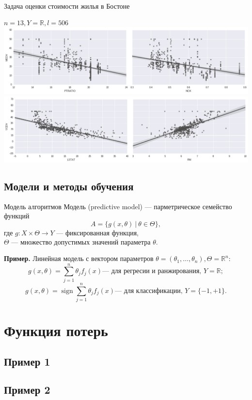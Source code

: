 \documentclass[compress]{beamer}
\DeclareMathOperator{\sign}{sign}
\begin{document}
\begin{frame}{Задача оценки стоимости жилья в Бостоне}
    \begin{center}
        $n = 13, Y= \mathbb{R}, l = 506$
        \includegraphics[width=\linewidth]{fig/boston1.png}
        \\
        \includegraphics[width=\linewidth]{fig/boston2.png}
    \end{center} 
\end{frame}

\subsection{Модели и методы обучения}
\begin{frame}{Модель алгоритмов}
Модель (predictive model) --- парметрическое семейство функций
$$
    A = \{g(x, \theta) ~|~ \theta \in \Theta\},
$$
где $g : X \times \Theta \rightarrow Y$ --- фиксированная функция,\\
$\Theta$ --- множество допустимых значений параметра $\theta$.

{\bf Пример.}
Линейная модель с вектором параметров $\theta = (\theta_1,\dots,\theta_n), \Theta = \mathbb{R}^n$:
$$
    g(x, \theta) = \sum\limits_{j=1}^{n}\theta_j f_j(x) \text{--- для регресии и ранжирования, $Y = \mathbb{R}$};
$$
$$
    g(x, \theta) = \sign\sum\limits_{j=1}^{n}\theta_j f_j(x) \text{--- для классификации, $Y = \{-1, +1\}$}.
$$
\end{frame}


\section{Функция потерь}
\subsection{Пример 1}
\begin{frame}
\end{frame}
\subsection{Пример 2}
\begin{frame}
\end{frame}
\end{document}
